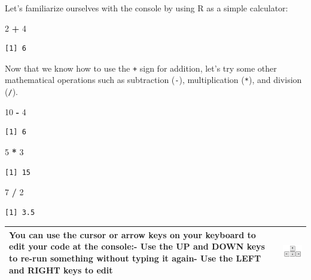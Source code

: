 \documentclass[]{article}
\newenvironment{Shaded}{\begin{snugshade}}{\end{snugshade}}
\newcommand{\DecValTok}[1]{\textcolor[rgb]{0.00,0.00,0.81}{#1}}
\newcommand{\OperatorTok}[1]{\textcolor[rgb]{0.81,0.36,0.00}{\textbf{#1}}}
\newcommand{\StringTok}[1]{\textcolor[rgb]{0.31,0.60,0.02}{#1}}
\begin{document}
Let's familiarize ourselves with the console by using R as a simple calculator:

\begin{Shaded}
\begin{Highlighting}[]
\DecValTok{2} \OperatorTok{+}\StringTok{ }\DecValTok{4}
\end{Highlighting}
\end{Shaded}

\begin{verbatim}
[1] 6
\end{verbatim}

Now that we know how to use the \texttt{+} sign for addition, let's try some other mathematical operations such as subtraction (\texttt{-}), multiplication (\texttt{*}), and division (\texttt{/}).

\begin{Shaded}
\begin{Highlighting}[]
\DecValTok{10} \OperatorTok{-}\StringTok{ }\DecValTok{4}
\end{Highlighting}
\end{Shaded}

\begin{verbatim}
[1] 6
\end{verbatim}

\begin{Shaded}
\begin{Highlighting}[]
\DecValTok{5} \OperatorTok{*}\StringTok{ }\DecValTok{3}
\end{Highlighting}
\end{Shaded}

\begin{verbatim}
[1] 15
\end{verbatim}

\begin{Shaded}
\begin{Highlighting}[]
\DecValTok{7} \OperatorTok{/}\StringTok{ }\DecValTok{2}
\end{Highlighting}
\end{Shaded}

\begin{verbatim}
[1] 3.5
\end{verbatim}

\begin{longtable}[]{@{}ll@{}}
\toprule
\endhead
\begin{minipage}[t]{0.69\columnwidth}\raggedright
You can use the cursor or arrow keys on your keyboard to edit your code at the console:- Use the UP and DOWN keys to re-run something without typing it again- Use the LEFT and RIGHT keys to edit\strut
\end{minipage} & \begin{minipage}[t]{0.25\columnwidth}\raggedright
\includegraphics{./img/rstudio_cursorkeys.png}\strut
\end{minipage}\tabularnewline
\bottomrule
\end{longtable}
\end{document}
